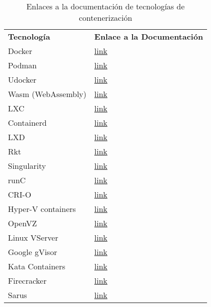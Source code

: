 \begin{table}[htbp]
\centering
{}
\begin{tabularx}{\textwidth}{>{\raggedright\arraybackslash}X >{\raggedright\arraybackslash}X}
\rowcolor{gray!30}
\textbf{Tecnología} & \textbf{Enlace a la Documentación} \\

Docker & \href{https://docs.docker.com/}{link} \\
Podman & \href{https://podman.io/docs}{link} \\
Udocker & \href{https://github.com/indigo-dc/udocker}{link} \\
Wasm (WebAssembly) & \href{https://webassembly.org/docs/faq/}{link} \\
LXC & \href{https://linuxcontainers.org/incus/docs/main/}{link} \\
Containerd & \href{https://containerd.io/docs/}{link} \\
LXD & \href{https://linuxcontainers.org/incus/docs/main/}{link} \\
Rkt & \href{https://github.com/rkt/rkt}{link} \\
Singularity & \href{https://docs.sylabs.io/guides/4.3/user-guide/}{link} \\
runC & \href{https://github.com/opencontainers/runc}{link} \\
CRI-O & \href{https://github.com/cri-o/cri-o}{link} \\
Hyper-V containers & \href{https://docs.microsoft.com/en-us/virtualization/windowscontainers/}{link} \\
OpenVZ & \href{https://openvz.org/}{link} \\
Linux VServer & \href{http://linux-vserver.org/Documentation}{link} \\
Google gVisor & \href{https://gvisor.dev/docs/}{link} \\
Kata Containers & \href{https://katacontainers.io/docs/}{link} \\
Firecracker & \href{https://firecracker-microvm.github.io/}{link} \\
Sarus & \href{https://github.com/eth-cscs/sarus}{link} \\

\end{tabularx}
\caption{Enlaces a la documentación de tecnologías de contenerización}
\end{table}